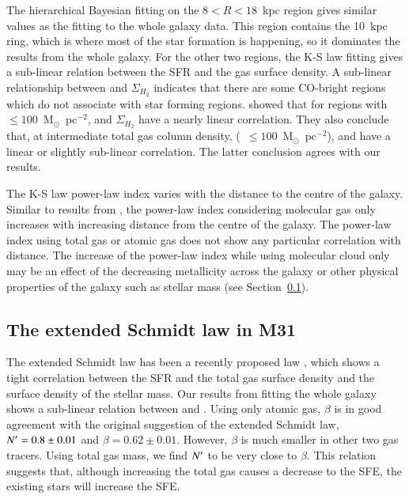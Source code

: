 The hierarchical Bayesian fitting on the $8<R<18$~kpc region gives similar values as the fitting to the whole galaxy data. This region contains the 10~kpc ring, which is where most of the star formation is happening, so it dominates the results from the whole galaxy.  For the other two regions, the K-S law fitting gives a sub-linear relation between the SFR and the gas surface density. A sub-linear relationship between \sigmasfr and  $\Sigma_{H_2}$ indicates that there are some CO-bright regions which do not associate with star forming regions.
 \citet{Krumholz09} showed that for regions with \sigmagas~$\leq 100$~M$_{\odot}$~pc$^{-2}$, \sigmasfr and $\Sigma_{H_2}$ have a nearly linear correlation. They also conclude that, at intermediate total gas column density, (\sigmagas~$\leq 100$~M$_{\odot}$~pc$^{-2}$), \sigmasfr and \sigmagas have a linear or slightly sub-linear correlation. The latter conclusion agrees with our results.


The K-S law power-law index varies with the distance to the centre of the galaxy. Similar to results from \citet{Ford13}, the power-law index considering molecular gas only increases with increasing distance from the centre of the galaxy. The power-law index using total gas or atomic gas does not show any particular correlation with distance. The increase of the power-law index while using molecular cloud only may be an effect of the decreasing metallicity across the galaxy or other physical properties of the galaxy such as stellar mass (see Section~\ref{sec:es_res}).
  
\subsection{The extended Schmidt law in M31}
\label{sec:es_res}
The extended Schmidt law has been a recently proposed law \citep{Shi11}, which shows a tight correlation between the SFR and the total gas surface density and the surface density of the stellar mass. Our results from fitting the whole galaxy shows a sub-linear relation between \sigmasfr and \sigmastar.
Using only atomic gas, $\beta$ is in good agreement with the original suggestion of the extended Schmidt law, $N^\prime = 0.8 \pm 0.01$ and $\beta = 0.62\pm0.01$. However, $\beta$ is much smaller in other two gas tracers. Using total gas mass, we find $N^\prime$ to be very close to $\beta$. This relation suggests that, although increasing the total gas causes a decrease to the SFE, the existing stars will increase the SFE. 

